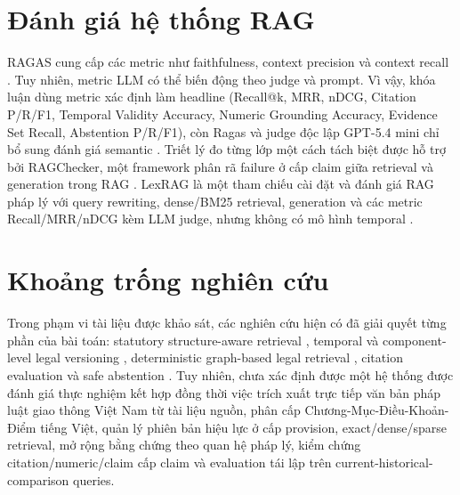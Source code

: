 \documentclass[a4paper,12pt]{extreport}
\begin{document}
\section{Đánh giá hệ thống RAG}

RAGAS cung cấp các metric như faithfulness, context precision và context recall \cite{es2024ragas,ragas2026metrics}. Tuy nhiên, metric LLM có thể biến động theo judge và prompt. Vì vậy, khóa luận dùng metric xác định làm headline (Recall@k, MRR, nDCG, Citation P/R/F1, Temporal Validity Accuracy, Numeric Grounding Accuracy, Evidence Set Recall, Abstention P/R/F1), còn Ragas và judge độc lập GPT-5.4 mini chỉ bổ sung đánh giá semantic \cite{openai2026gpt54mini}. Triết lý đo từng lớp một cách tách biệt được hỗ trợ bởi RAGChecker, một framework phân rã failure ở cấp claim giữa retrieval và generation trong RAG \cite{ru2024ragchecker}. LexRAG là một tham chiếu cài đặt và đánh giá RAG pháp lý với query rewriting, dense/BM25 retrieval, generation và các metric Recall/MRR/nDCG kèm LLM judge, nhưng không có mô hình temporal \cite{li2025lexrag}.

\section{Khoảng trống nghiên cứu}

\begin{sloppypar}
Trong phạm vi tài liệu được khảo sát, các nghiên cứu hiện có đã giải quyết từng phần của bài toán: statutory structure-aware retrieval \cite{louis2023findinglaw}, temporal và component-level legal versioning \cite{demartim2025temporal}, deterministic graph-based legal retrieval \cite{demartim2025satgraph}, citation evaluation \cite{gao2023alce} và safe abstention \cite{chae2026searchfire}. Tuy nhiên, chưa xác định được một hệ thống được đánh giá thực nghiệm kết hợp đồng thời việc trích xuất trực tiếp văn bản pháp luật giao thông Việt Nam từ tài liệu nguồn, phân cấp Chương-Mục-Điều-Khoản-Điểm tiếng Việt, quản lý phiên bản hiệu lực ở cấp provision, exact/dense/sparse retrieval, mở rộng bằng chứng theo quan hệ pháp lý, kiểm chứng citation/numeric/claim cấp claim và evaluation tái lập trên current-historical-comparison queries.
\end{sloppypar}
\end{document}
